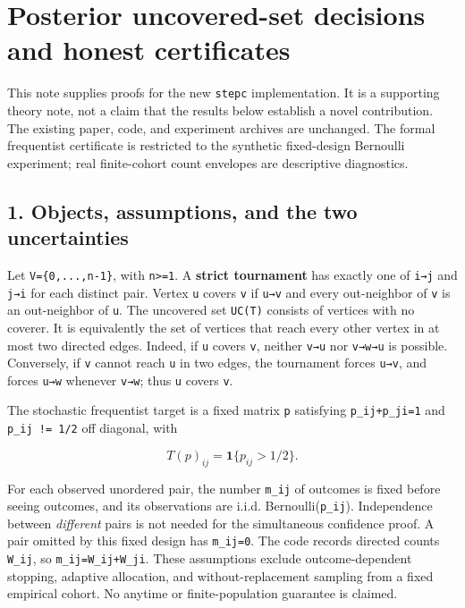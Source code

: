 \documentclass[
  11pt,
]{article}
\author{}
\date{}
\begin{document}
\hypertarget{posterior-uncovered-set-decisions-and-honest-certificates}{%
\section{Posterior uncovered-set decisions and honest
certificates}\label{posterior-uncovered-set-decisions-and-honest-certificates}}

This note supplies proofs for the new \texttt{stepc} implementation. It
is a supporting theory note, not a claim that the results below
establish a novel contribution. The existing paper, code, and experiment
archives are unchanged. The formal frequentist certificate is restricted
to the synthetic fixed-design Bernoulli experiment; real finite-cohort
count envelopes are descriptive diagnostics.

\hypertarget{objects-assumptions-and-the-two-uncertainties}{%
\subsection{1. Objects, assumptions, and the two
uncertainties}\label{objects-assumptions-and-the-two-uncertainties}}

Let \texttt{V=\{0,...,n-1\}}, with \texttt{n\textgreater{}=1}. A
\textbf{strict tournament} has exactly one of \texttt{i→j} and
\texttt{j→i} for each distinct pair. Vertex \texttt{u} covers \texttt{v}
if \texttt{u→v} and every out-neighbor of \texttt{v} is an out-neighbor
of \texttt{u}. The uncovered set \texttt{UC(T)} consists of vertices
with no coverer. It is equivalently the set of vertices that reach every
other vertex in at most two directed edges. Indeed, if \texttt{u} covers
\texttt{v}, neither \texttt{v→u} nor \texttt{v→w→u} is possible.
Conversely, if \texttt{v} cannot reach \texttt{u} in two edges, the
tournament forces \texttt{u→v}, and forces \texttt{u→w} whenever
\texttt{v→w}; thus \texttt{u} covers \texttt{v}.

The stochastic frequentist target is a fixed matrix \texttt{p}
satisfying \texttt{p\_ij+p\_ji=1} and \texttt{p\_ij\ !=\ 1/2} off
diagonal, with

\[
T(p)_{ij}=\mathbf 1\{p_{ij}>1/2\}.
\]

For each observed unordered pair, the number \texttt{m\_ij} of outcomes
is fixed before seeing outcomes, and its observations are i.i.d.
Bernoulli(\texttt{p\_ij}). Independence between \emph{different} pairs
is not needed for the simultaneous confidence proof. A pair omitted by
this fixed design has \texttt{m\_ij=0}. The code records directed counts
\texttt{W\_ij}, so \texttt{m\_ij=W\_ij+W\_ji}. These assumptions exclude
outcome-dependent stopping, adaptive allocation, and without-replacement
sampling from a fixed empirical cohort. No anytime or finite-population
guarantee is claimed.
\end{document}
